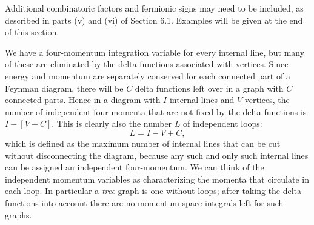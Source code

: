 Additional combinatoric factors and fermionic signs may need to be included,
as described in parts (v) and (vi) of Section 6.1. Examples will be given at
the end of this section.

We have a four-momentum integration variable for every internal line, but many
of these are eliminated by the delta functions associated with vertices. Since
energy and momentum are separately conserved for each connected part of a
Feynman diagram, there will be $C$ delta functions left over in a graph with
$C$ connected parts. Hence in a diagram with $I$ internal lines and $V$
vertices, the number of independent four-momenta that are not fixed by the
delta functions is $I-[V-C]$. This is clearly also the number $L$ of
independent loops:
\begin{equation}
L=I-V+C,
\tag{6.3.4}
\label{eq:6.3.4}
\end{equation}
which is defined as the maximum number of internal lines that can be cut
without disconnecting the diagram, because any such and only such internal
lines can be assigned an independent four-momentum. We can think of the
independent momentum variables as characterizing the momenta that circulate in
each loop. In particular a \textit{tree} graph is one without loops; after
taking the delta functions into account there are no momentum-space integrals
left for such graphs.

